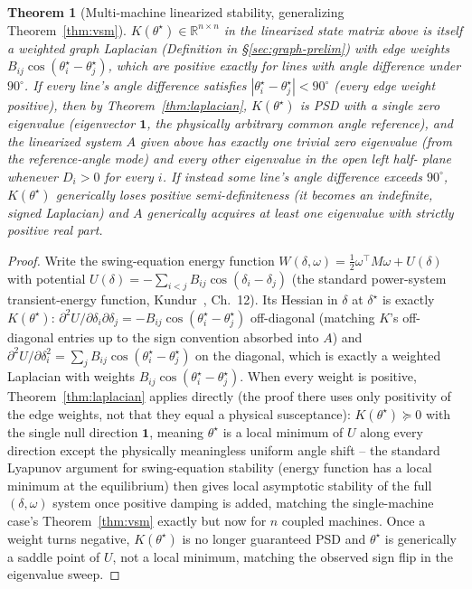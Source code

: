 \documentclass[11pt]{report}
\theoremstyle{plain}
\newtheorem{theorem}{Theorem}[chapter]
\theoremstyle{definition}
\theoremstyle{remark}
\begin{document}
\begin{theorem}[Multi-machine linearized stability, generalizing Theorem~\ref{thm:vsm}]
\label{thm:multimachine-stability}
$K(\theta^\star)\in\mathbb{R}^{n\times n}$ in the linearized state
matrix above is
itself a weighted graph Laplacian (Definition in
\S\ref{sec:graph-prelim}) with edge weights $B_{ij}\cos(\theta_i^\star-
\theta_j^\star)$, which are positive exactly for lines with angle
difference under $90^\circ$. If every line's angle difference satisfies
$\left|\theta_i^\star-\theta_j^\star\right|<90^\circ$ (every edge weight positive),
then by Theorem~\ref{thm:laplacian}, $K(\theta^\star)$ is PSD with a
single zero eigenvalue (eigenvector $\mathbf1$, the physically arbitrary
common angle reference), and the linearized system $A$ given
above has exactly one trivial zero eigenvalue (from the
reference-angle mode) and every other eigenvalue in the open left half-
plane whenever $D_i>0$ for every $i$. If instead some line's angle
difference exceeds $90^\circ$, $K(\theta^\star)$ generically loses
positive semi-definiteness (it becomes an \emph{indefinite}, signed
Laplacian) and $A$ generically acquires at least one eigenvalue with
strictly positive real part.
\end{theorem}
\begin{proof}
Write the swing-equation energy function $W(\delta,\omega)=
\tfrac12\omega^\top M\omega+U(\delta)$ with potential
$U(\delta)=-\sum_{i<j}B_{ij}\cos(\delta_i-\delta_j)$ (the standard
power-system transient-energy function, Kundur~\cite{kundur}, Ch.~12).
Its Hessian in $\delta$ at $\delta^\star$ is exactly $K(\theta^\star)$:
$\partial^2U/\partial\delta_i\partial\delta_j=-B_{ij}\cos(\theta_i^\star-
\theta_j^\star)$ off-diagonal (matching $K$'s off-diagonal entries up to
the sign convention absorbed into $A$) and
$\partial^2U/\partial\delta_i^2=\sum_{j}B_{ij}\cos(\theta_i^\star-
\theta_j^\star)$ on the diagonal, which is exactly a weighted Laplacian
with weights $B_{ij}\cos(\theta_i^\star-\theta_j^\star)$. When every
weight is positive, Theorem~\ref{thm:laplacian} applies directly (the
proof there uses only positivity of the edge weights, not that they
equal a physical susceptance): $K(\theta^\star)\succeq0$ with the
single null direction $\mathbf1$, meaning $\theta^\star$ is a local
minimum of $U$ along every direction except the physically meaningless
uniform angle shift -- the standard Lyapunov argument for swing-equation
stability (energy function has a local minimum at the equilibrium) then
gives local asymptotic stability of the full $(\delta,\omega)$ system
once positive damping is added, matching the single-machine case's
Theorem~\ref{thm:vsm} exactly but now for $n$ coupled machines. Once a
weight turns negative, $K(\theta^\star)$ is no longer guaranteed
PSD and $\theta^\star$ is generically a saddle point of $U$, not a
local minimum, matching the observed sign flip in the eigenvalue
sweep.
\end{proof}
\end{document}
